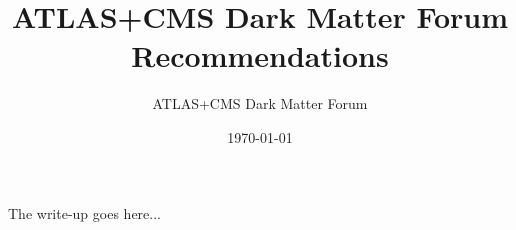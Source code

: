 \documentclass[a4,debug,notitlepage]{tufte-book}
\title{ATLAS+CMS Dark Matter Forum Recommendations}
\author{ATLAS+CMS Dark Matter Forum}
\date{\today}
\newcommand{\blankpage}{\newpage\hbox{}\thispagestyle{empty}\newpage}
\begin{document}
\morefloats
\setcounter{secnumdepth}{-1} %



\blankpage

The write-up goes here...
\end{document}
